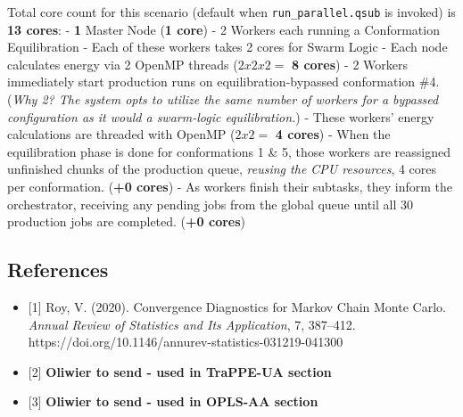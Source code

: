 \documentclass[
]{article}
\providecommand{\tightlist}{%
  \setlength{\itemsep}{0pt}\setlength{\parskip}{0pt}}
\begin{document}
Total core count for this scenario (default when
\texttt{run\_parallel.qsub} is invoked) is \textbf{13 cores}: -
\textbf{1} Master Node (\textbf{1 core}) - 2 Workers each running a
Conformation Equilibration - Each of these workers takes 2 cores for
Swarm Logic - Each node calculates energy via 2 OpenMP threads
(\(2x2x2=\) \textbf{8 cores}) - 2 Workers immediately start production
runs on equilibration-bypassed conformation \#4. (\emph{Why 2? The
system opts to utilize the same number of workers for a bypassed
configuration as it would a swarm-logic equilibration.}) - These
workers' energy calculations are threaded with OpenMP (\(2x2=\)
\textbf{4 cores}) - When the equilibration phase is done for
conformations 1 \& 5, those workers are reassigned unfinished chunks of
the production queue, \emph{reusing the CPU resources}, 4 cores per
conformation. (\textbf{+0 cores}) - As workers finish their subtasks,
they inform the orchestrator, receiving any pending jobs from the global
queue until all 30 production jobs are completed. (\textbf{+0 cores})

\subsection{References}\label{references}

\begin{itemize}
\tightlist
\item
  {[}1{]} Roy, V. (2020). Convergence Diagnostics for Markov Chain Monte
  Carlo. \emph{Annual Review of Statistics and Its Application}, 7,
  387--412. https://doi.org/10.1146/annurev-statistics-031219-041300
\item
  {[}2{]} \textbf{Oliwier to send - used in TraPPE-UA section}
\item
  {[}3{]} \textbf{Oliwier to send - used in OPLS-AA section}
\end{itemize}
\end{document}

